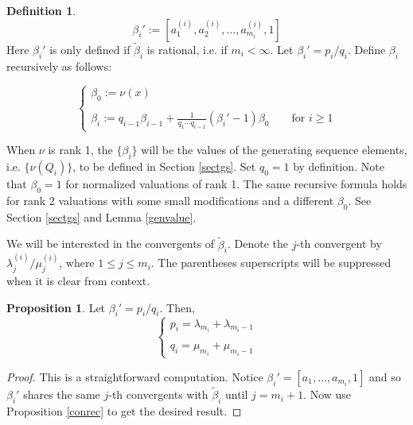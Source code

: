 \documentclass[11pt]{amsart}
\theoremstyle{definition}
\newtheorem{prop}[thm]{Proposition}
\newtheorem*{defin}{Definition}
\begin{document}
{\begin{defin}
\begin{equation*}
\beta_i' := \left[a_1^{(i)}, a_2^{(i)}, \ldots, a_{m_i}^{(i)}, 1\right]
\end{equation*}
Here $\beta_i'$ is only defined if $\tilde \beta_i$ is rational, i.e. if $m_i < \infty$. Let $\beta_i'=p_i/q_i$. Define $\beta_i$ recursively as follows:

\begin{equation} \label{betarecur}
\left\{
\begin{array}{l}
\beta_0 := \nu(x)
\\\\
\displaystyle \beta_i := q_{i-1}\beta_{i-1} + \frac{1}{q_1 \cdots q_{i-1}}\left(\beta_i'-1\right)\beta_0 \quad \quad \text{for\ } i\geq1
\end{array}
\right.
\end{equation}
\end{defin}

When $\nu$ is rank 1, the $\{\beta_i\}$ will be the values of the generating sequence elements, i.e. $\{\nu(Q_i)\}$, to be defined in Section \ref{sectgs}. Set $q_0=1$ by definition. Note that $\beta_0=1$ for normalized valuations of rank 1. The same recursive formula holds for rank 2 valuations with some small modifications and a different $\beta_0$. See Section \ref{sectgs} and Lemma \ref{genvalue}.

We will be interested in the convergents of $\tilde \beta_i$. Denote the $j$-th convergent by $\lambda_j^{(i)}/\mu_j^{(i)}$, where $1\leq j\leq m_i$. The parentheses superscripts will be suppressed when it is clear from context.

\begin{prop} \label{pq}
Let $\beta_i'=p_i/q_i$. Then,
\begin{equation*}
\left\{
\begin{array}{l}
p_i=\lambda_{m_i} + \lambda_{m_i-1}
\\\\
q_i=\mu_{m_i} + \mu_{m_i-1}
\end{array}
\right.
\end{equation*}
\end{prop}
\begin{proof}
This is a straightforward computation. Notice $\displaystyle \beta_i'=[a_1,\ldots,a_{m_i},1]$ and so $\beta_i'$ shares the same $j$-th convergents with $\tilde \beta_i$ until $j=m_i+1$. Now use Proposition \ref{conrec} to get the desired result.
\end{proof}

}
\end{document}
